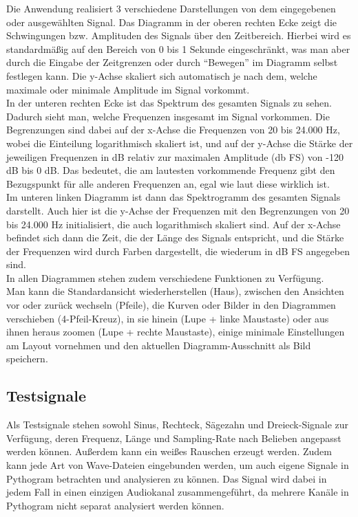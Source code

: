\documentclass[a4paper]{article}
\begin{document}
Die Anwendung realisiert 3 verschiedene Darstellungen von dem eingegebenen oder ausgewählten Signal. Das Diagramm in der oberen rechten Ecke zeigt die Schwingungen bzw. Amplituden des Signals über den Zeitbereich. Hierbei wird es standardmäßig auf den Bereich von 0 bis 1 Sekunde eingeschränkt, was man aber durch die Eingabe der Zeitgrenzen oder durch "`Bewegen"' im Diagramm selbst festlegen kann. Die y-Achse skaliert sich automatisch je nach dem, welche maximale oder minimale Amplitude im Signal vorkommt.\\
In der unteren rechten Ecke ist das Spektrum des gesamten Signals zu sehen. Dadurch sieht man, welche Frequenzen insgesamt im Signal vorkommen. Die Begrenzungen sind dabei auf der x-Achse die Frequenzen von 20 bis 24.000 Hz, wobei die Einteilung logarithmisch skaliert ist, und auf der y-Achse die Stärke der jeweiligen Frequenzen in dB relativ zur maximalen Amplitude (db FS) von -120 dB bis 0 dB. Das bedeutet, die am lautesten vorkommende Frequenz gibt den Bezugspunkt für alle anderen Frequenzen an, egal wie laut diese wirklich ist.\\
Im unteren linken Diagramm ist dann das Spektrogramm des gesamten Signals darstellt. Auch hier ist die y-Achse der Frequenzen mit den Begrenzungen von 20 bis 24.000 Hz initialisiert, die auch logarithmisch skaliert sind. Auf der x-Achse befindet sich dann die Zeit, die der Länge des Signals entspricht, und die Stärke der Frequenzen wird durch Farben dargestellt, die wiederum in dB FS angegeben sind.\vspace{1em}\\
In allen Diagrammen stehen zudem verschiedene Funktionen zu Verfügung.\\
Man kann die Standardansicht wiederherstellen (Haus), zwischen den Ansichten vor oder zurück wechseln (Pfeile), die Kurven oder Bilder in den Diagrammen verschieben (4-Pfeil-Kreuz), in sie hinein (Lupe + linke Maustaste) oder aus ihnen heraus zoomen (Lupe + rechte Maustaste), einige minimale Einstellungen am Layout vornehmen und den aktuellen Diagramm-Ausschnitt als Bild speichern.

\subsection{Testsignale}

Als Testsignale stehen sowohl Sinus, Rechteck, Sägezahn und Dreieck-Signale zur Verfügung, deren Frequenz, Länge und Sampling-Rate nach Belieben angepasst werden können. Außerdem kann ein weißes Rauschen erzeugt werden. Zudem kann jede Art von Wave-Dateien eingebunden werden, um auch eigene Signale in Pythogram betrachten und analysieren zu können. Das Signal wird dabei in jedem Fall in einen einzigen Audiokanal zusammengeführt, da mehrere Kanäle in Pythogram nicht separat analysiert werden können.\vspace{2em}
\noindent
[Bilder?]
\end{document}
